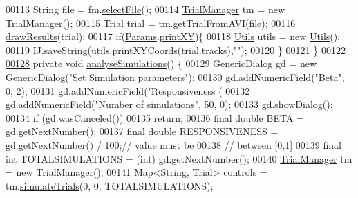 \begin{DoxyCode}
00113     String file = fm.\hyperlink{classfunctions_1_1_file_manager_aa741a9e7ac4127ae1a463fb626474edf}{selectFile}();
00114     \hyperlink{classfunctions_1_1_trial_manager}{TrialManager} tm = \textcolor{keyword}{new} \hyperlink{classfunctions_1_1_trial_manager}{TrialManager}();
00115     \hyperlink{classdata_1_1_trial}{Trial} trial = tm.\hyperlink{classfunctions_1_1_trial_manager_a5d815ce30de28983d08c22c909562e11}{getTrialFromAVI}(file);
00116     \hyperlink{classanalysis_1_1_chemotaxis_ab864eab3ca8e5147e34d6a4747d24e72}{drawResults}(trial);
00117     \textcolor{keywordflow}{if}(\hyperlink{classdata_1_1_params}{Params}.\hyperlink{classdata_1_1_params_ae8b85275ab9c5375a3d35dcb7cd8332f}{printXY})\{
00118       \hyperlink{classfunctions_1_1_utils}{Utils} utils = \textcolor{keyword}{new} \hyperlink{classfunctions_1_1_utils}{Utils}();
00119       IJ.saveString(utils.\hyperlink{classfunctions_1_1_utils_ab85218da3569b5a7c0b9749e7b2b747a}{printXYCoords}(trial.\hyperlink{classdata_1_1_trial_ab0c3156759c41236f7f0bc83e1e5ef8f}{tracks}),\textcolor{stringliteral}{""});
00120     \}
00121   \}
00122 
\hypertarget{_chemotaxis_8java_source_l00128}{}\hyperlink{classanalysis_1_1_chemotaxis_ad992aa584aa410ee10b0b5df660c43ec}{00128}   \textcolor{keyword}{private} \textcolor{keywordtype}{void} \hyperlink{classanalysis_1_1_chemotaxis_ad992aa584aa410ee10b0b5df660c43ec}{analyseSimulations}() \{
00129     GenericDialog gd = \textcolor{keyword}{new} GenericDialog(\textcolor{stringliteral}{"Set Simulation parameters"});
00130     gd.addNumericField(\textcolor{stringliteral}{"Beta"}, 0, 2);
00131     gd.addNumericField(\textcolor{stringliteral}{"Responsiveness (%
00132     gd.addNumericField(\textcolor{stringliteral}{"Number of simulations"}, 50, 0);
00133     gd.showDialog();
00134     \textcolor{keywordflow}{if} (gd.wasCanceled())
00135       \textcolor{keywordflow}{return};
00136     \textcolor{keyword}{final} \textcolor{keywordtype}{double} BETA = gd.getNextNumber();
00137     \textcolor{keyword}{final} \textcolor{keywordtype}{double} RESPONSIVENESS = gd.getNextNumber() / 100;\textcolor{comment}{// value must be}
00138                                                            \textcolor{comment}{// between [0,1]}
00139     \textcolor{keyword}{final} \textcolor{keywordtype}{int} TOTALSIMULATIONS = (int) gd.getNextNumber();
00140     \hyperlink{classfunctions_1_1_trial_manager}{TrialManager} tm = \textcolor{keyword}{new} \hyperlink{classfunctions_1_1_trial_manager}{TrialManager}();
00141     Map<String, Trial> controls = tm.\hyperlink{classfunctions_1_1_trial_manager_a83f9d10eaa1ef4efb6de1f0e8b690978}{simulateTrials}(0, 0, TOTALSIMULATIONS);
}
\end{DoxyCode}
